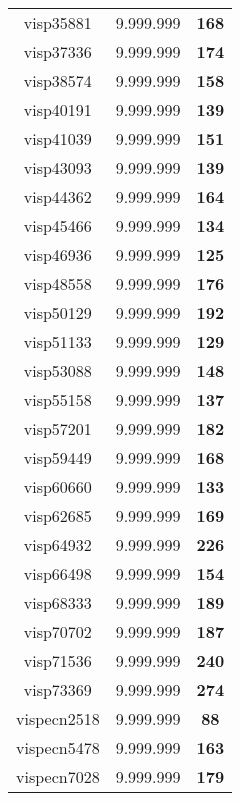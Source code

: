 \begin{tabular}{cc||c}
visp35881        & 9.999.999        & {\bf 168}       \\ 
visp37336        & 9.999.999        & {\bf 174}       \\ 
visp38574        & 9.999.999        & {\bf 158}       \\ 
visp40191        & 9.999.999        & {\bf 139}       \\ 
visp41039        & 9.999.999        & {\bf 151}       \\ 
visp43093        & 9.999.999        & {\bf 139}       \\ 
visp44362        & 9.999.999        & {\bf 164}       \\ 
visp45466        & 9.999.999        & {\bf 134}       \\ 
visp46936        & 9.999.999        & {\bf 125}       \\ 
visp48558        & 9.999.999        & {\bf 176}       \\ 
visp50129        & 9.999.999        & {\bf 192}       \\ 
visp51133        & 9.999.999        & {\bf 129}       \\ 
visp53088        & 9.999.999        & {\bf 148}       \\ 
visp55158        & 9.999.999        & {\bf 137}       \\ 
visp57201        & 9.999.999        & {\bf 182}       \\ 
visp59449        & 9.999.999        & {\bf 168}       \\ 
visp60660        & 9.999.999        & {\bf 133}       \\ 
visp62685        & 9.999.999        & {\bf 169}       \\ 
visp64932        & 9.999.999        & {\bf 226}       \\ 
visp66498        & 9.999.999        & {\bf 154}       \\ 
visp68333        & 9.999.999        & {\bf 189}       \\ 
visp70702        & 9.999.999        & {\bf 187}       \\ 
visp71536        & 9.999.999        & {\bf 240}       \\ 
visp73369        & 9.999.999        & {\bf 274}       \\ 
vispecn2518      & 9.999.999        & {\bf 88}        \\ 
vispecn5478      & 9.999.999        & {\bf 163}       \\ 
vispecn7028      & 9.999.999        & {\bf 179}       \\ 

\end{tabular}
